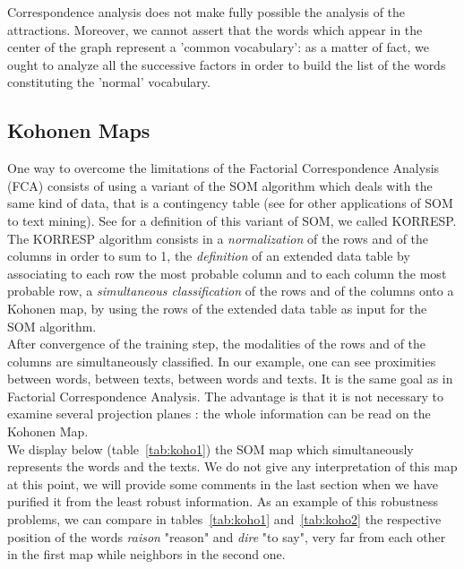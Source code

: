 \documentclass[preprint]{elsarticle}
\begin{document}
Correspondence analysis does not make fully possible the analysis of the attractions. Moreover, we cannot assert that the words which appear in the center of the graph represent a 'common vocabulary': as a matter of fact, we ought to analyze all the successive factors in order to build the list of the words constituting the 'normal' vocabulary.\\

\subsection{Kohonen Maps}

One way to overcome the limitations of the Factorial Correspondence Analysis (FCA) consists of using a variant of the SOM algorithm which deals with the same kind of data, that is a contingency table (see \cite{oja99} for other applications of SOM to text mining). See \cite{cottrell98} for a definition of this variant of SOM, we called KORRESP.\\

The KORRESP algorithm consists in a \textit{normalization} of the rows and of the columns in order to sum to 1, the \textit{definition} of an extended data table by associating to each row the most probable column and to each column the most probable row, a \textit{simultaneous classification} of the rows and of the columns onto a Kohonen map, by using the rows of the extended data table as input for the SOM algorithm.\\

After convergence of the training step, the modalities of the rows and of the columns are simultaneously classified. In our example, one can see proximities between words, between texts, between words and texts. It is the same goal as in Factorial Correspondence Analysis. The advantage is that it is not necessary to examine several projection planes : the whole information can be read on the Kohonen Map.\\

We display below (table~\ref{tab:koho1}) the SOM map which simultaneously represents the words and the texts. %
We do not give any interpretation of this map at this point, we will provide some comments in the last section when we have purified it from the least robust information. As an example of this robustness problems, we can compare in tables~\ref{tab:koho1} and~\ref{tab:koho2} the respective position of the words \textit{raison} "reason" and \textit{dire} "to say", very far from each other in the first map while neighbors in the second one.\\
\end{document}
